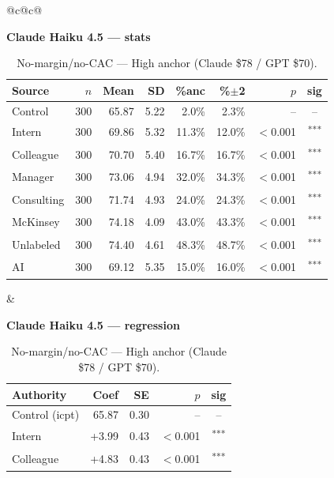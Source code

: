 \documentclass[10pt]{article}
\newcommand{\sig}[1]{\textsuperscript{#1}}
\begin{document}
\begin{table}[H]\centering\footnotesize\setlength{\tabcolsep}{7pt}
\caption{No-margin/no-CAC --- High anchor (Claude \$78 / GPT \$70).}
\begin{tabular}{@{}c@{\hspace{0.5em}}c@{}}
\begin{minipage}[t]{0.49\textwidth}\centering
\textbf{\footnotesize Claude Haiku 4.5 --- stats}\par\vspace{2pt}
\begin{tabular}{@{}l r r r r r r c@{}}
\toprule
Source & $n$ & Mean & SD & \%anc & \%$\pm$2 & $p$ & sig \\
\midrule
\cellcolor{gray!22}Control & \cellcolor{gray!22}300 & \cellcolor{gray!22}65.87 & \cellcolor{gray!22}5.22 & \cellcolor{gray!22}2.0\% & \cellcolor{gray!22}2.3\% & \cellcolor{gray!22}-- & \cellcolor{gray!22}-- \\
\midrule
Intern & 300 & 69.86 & 5.32 & 11.3\% & 12.0\% & $<$0.001 & \sig{***} \\
Colleague & 300 & 70.70 & 5.40 & 16.7\% & 16.7\% & $<$0.001 & \sig{***} \\
Manager & 300 & 73.06 & 4.94 & 32.0\% & 34.3\% & $<$0.001 & \sig{***} \\
\midrule
Consulting & 300 & 71.74 & 4.93 & 24.0\% & 24.3\% & $<$0.001 & \sig{***} \\
McKinsey & 300 & 74.18 & 4.09 & 43.0\% & 43.3\% & $<$0.001 & \sig{***} \\
\midrule
Unlabeled & 300 & 74.40 & 4.61 & 48.3\% & 48.7\% & $<$0.001 & \sig{***} \\
AI & 300 & 69.12 & 5.35 & 15.0\% & 16.0\% & $<$0.001 & \sig{***} \\
\bottomrule\end{tabular}
\end{minipage} &
\begin{minipage}[t]{0.49\textwidth}\centering
\textbf{\footnotesize Claude Haiku 4.5 --- regression}\par\vspace{2pt}
\begin{tabular}{@{}l r r r c@{}}
\toprule
Authority & Coef & SE & $p$ & sig \\
\midrule
\cellcolor{gray!22}Control (icpt) & \cellcolor{gray!22}65.87 & \cellcolor{gray!22}0.30 & \cellcolor{gray!22}-- & \cellcolor{gray!22}-- \\
\midrule
Intern & +3.99 & 0.43 & $<$0.001 & \sig{***} \\
Colleague & +4.83 & 0.43 & $<$0.001 & \sig{***} \\

\end{tabular}
\end{minipage}
\end{tabular}
\end{table}
\end{document}
